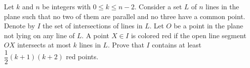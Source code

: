 Let $ k$ and $ n$ be integers with $ 0\le k\le n - 2$. Consider a set $ L$ of $ n$ lines in the plane such that no two of them are parallel and no three have a common point. Denote by $ I$ the set of intersections of lines in $ L$. Let $ O$ be a point in the plane not lying on any line of $ L$. A point $ X\in I$ is colored red if the open line segment $ OX$ intersects at most $ k$ lines in $ L$. Prove that $ I$ contains at least $ \dfrac{1}{2}(k + 1)(k + 2)$ red points.